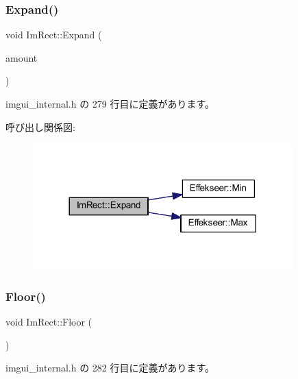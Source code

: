 \subsubsection{\texorpdfstring{Expand()}{Expand()}\hspace{0.1cm}{\footnotesize\ttfamily [2/2]}}
{\footnotesize\ttfamily void Im\+Rect\+::\+Expand (\begin{DoxyParamCaption}\item[{const \mbox{\hyperlink{struct_im_vec2}{Im\+Vec2}} \&}]{amount }\end{DoxyParamCaption})\hspace{0.3cm}{\ttfamily [inline]}}



 imgui\+\_\+internal.\+h の 279 行目に定義があります。

呼び出し関係図\+:\nopagebreak
\begin{figure}[H]
\begin{center}
\leavevmode
\includegraphics[width=284pt]{struct_im_rect_ac0b0b88fe65725b4694cd7d91d42d382_cgraph}
\end{center}
\end{figure}
\mbox{\label{struct_im_rect_a8fdf75a0c64ff29f65113cd9f8be77ab}} 
\subsubsection{\texorpdfstring{Floor()}{Floor()}}
{\footnotesize\ttfamily void Im\+Rect\+::\+Floor (\begin{DoxyParamCaption}{ }\end{DoxyParamCaption})\hspace{0.3cm}{\ttfamily [inline]}}



 imgui\+\_\+internal.\+h の 282 行目に定義があります。

